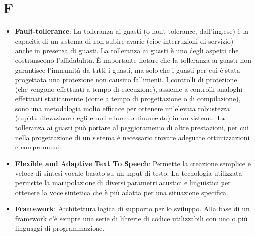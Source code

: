 \section{F}
\begin{itemize} 
	\item
	\textbf{Fault-tollerance}: La tolleranza ai guasti (o fault-tolerance, dall'inglese) è la capacità di un sistema di non subire avarie (cioè interruzioni di servizio) anche in presenza di guasti. La tolleranza ai guasti è uno degli aspetti che costituiscono l'affidabilità. È importante notare che la tolleranza ai guasti non garantisce l'immunità da tutti i guasti, ma solo che i guasti per cui è stata progettata una protezione non causino fallimenti.
	I controlli di protezione (che vengono effettuati a tempo di esecuzione), assieme a controlli analoghi effettuati staticamente (come a tempo di progettazione o di compilazione), sono una metodologia molto efficace per ottenere un'elevata robustezza (rapida rilevazione degli errori e loro confinamento) in un sistema.
	La tolleranza ai guasti può portare al peggioramento di altre prestazioni, per cui nella progettazione di un sistema è necessario trovare adeguate ottimizzazioni e compromessi.
	\item
	\textbf{Flexible and Adaptive Text To Speech}: Permette la creazione semplice e veloce di sintesi vocale basato su un input di testo. La tecnologia utilizzata permette la manipolazione di diversi parametri acustici e linguistici per ottenere la voce sintetica che è più adatta per una situazione specifica. 
	\item
	\textbf{Framework}: Architettura logica di supporto per lo sviluppo. Alla base di un framework c’è sempre una serie di librerie di codice utilizzabili con uno o più linguaggi di programmazione.
\end{itemize}